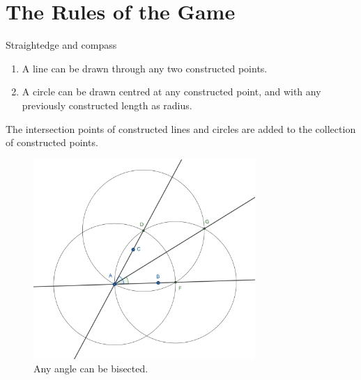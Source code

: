 \documentclass[handout]{beamer}
\begin{document}
    \section{The Rules of the Game}

    \begin{frame}{Straightedge and compass}
        \begin{enumerate}
            \item A line can be drawn through any two constructed points.
            \item A circle can be drawn centred at any constructed point, and with
            any previously constructed length as radius.
        \end{enumerate}
        \pause
        The intersection points of constructed lines and circles are added to the
        collection of constructed points.
    \end{frame}

    \begin{frame}
        \begin{figure}
        \begin{center}
            \includegraphics[width=0.75\textwidth]{bisector_.png}
        \end{center}
        \caption{Any angle can be bisected.}
        \label{fig:bisecting_angles}
        \end{figure}
    \end{frame}
\end{document}
